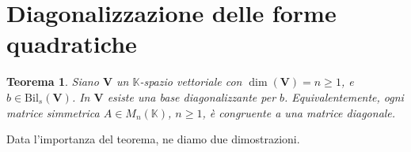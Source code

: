 \documentclass{article}
\theoremstyle{plain}
\newtheorem{thm}{Teorema}[section]
\theoremstyle{definition}
\theoremstyle{remark}
\begin{document}
\vspace{50pt}
\section{Diagonalizzazione delle forme quadratiche}
\vspace{20pt}

\begin{bxthm}
\begin{thm}\label{sediciunoo}
Siano $\mathbf{V}$ un $\mathbb{K}$-spazio vettoriale con $\dim(\mathbf{V}) = n \geq 1$, e $b\in\mathrm{Bil}_s(\mathbf{V})$. 
In $\mathbf{V}$ esiste una base diagonalizzante per $b$. Equivalentemente, ogni matrice simmetrica 
$A \in M_n(\mathbb{K})$, $n \geq 1$, è congruente a una matrice diagonale.
\end{thm}
\end{bxthm}

\vspace{10pt}

Data l'importanza del teorema, ne diamo due dimostrazioni.

\vspace{10pt}
\end{document}
